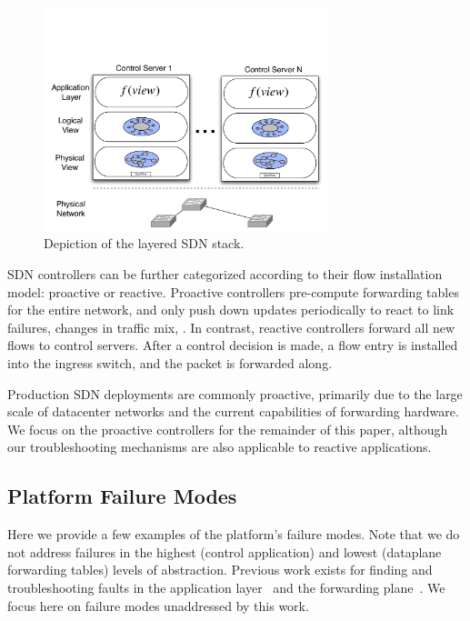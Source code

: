 \begin{figure}[t]
    \includegraphics[width=3.25in]{../diagrams/architecture/SDN_Stack.pdf}
    \caption[]{\label{fig:basicarch} Depiction of the layered SDN stack.} 
\end{figure}

SDN controllers can be further categorized according to their flow
installation model: proactive or reactive.
Proactive controllers pre-compute forwarding tables for the entire network,
and only push down updates periodically to react to link failures, changes in
traffic mix, \etc. In contrast, reactive controllers forward all new flows to
control servers. After a control decision is made, a flow entry is installed
into the ingress switch, and the packet is forwarded along.

Production SDN deployments are commonly proactive, primarily due to the large
scale of datacenter networks and the current capabilities of forwarding hardware.
We focus on the proactive controllers for the remainder of this paper,
although our troubleshooting mechanisms are also applicable to reactive
applications.

\subsection{Platform Failure Modes}

Here we provide a few examples of the platform's failure modes. Note that
we do not address failures in the highest (control application) and lowest
(dataplane forwarding tables) levels of abstraction. Previous work exists
for finding and troubleshooting faults in the application layer~\cite{nice}
and the forwarding plane~\cite{anteater}. We focus here on failure modes unaddressed
by this work.


